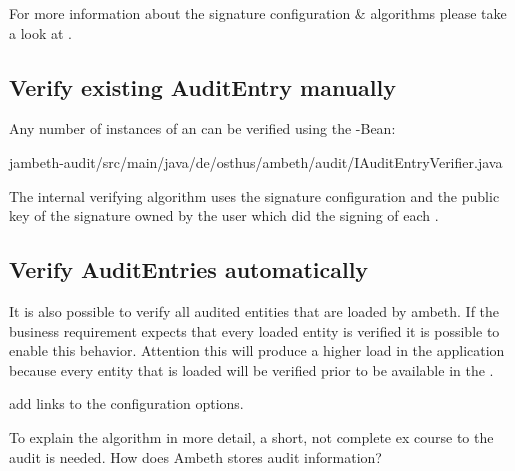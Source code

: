 \def\showimgref{img/gen/2014-10-04-DeK-Ambeth-Audit-4}

For more information about the signature configuration \& algorithms please take a look at .

\subsection{Verify existing AuditEntry manually}
Any number of instances of an  can be verified using the -Bean:

	{jambeth-audit/src/main/java/de/osthus/ambeth/audit/IAuditEntryVerifier.java}

The internal verifying algorithm uses the signature configuration and the public key of the signature owned by the user which did the signing of each .

\subsection{Verify AuditEntries automatically}
It is also possible to verify all audited entities that are loaded by ambeth. If the business requirement expects that every loaded entity is verified it is possible to enable this behavior. Attention this will produce a higher load in the application because every entity that is loaded will be verified prior to be available in the . 

\TODO add links to the configuration options.
 
To explain the algorithm in more detail, a short, not complete ex course to the audit is needed.
How does Ambeth stores audit information?
\pagebreak
\def\showimgref{img/audit-verify.png}

